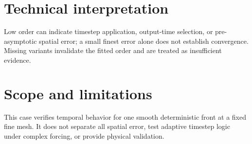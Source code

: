 \section{Technical interpretation}

Low order can indicate timestep application, output-time selection, or pre-asymptotic spatial error; a small finest error alone does not establish convergence. Missing variants invalidate the fitted order and are treated as insufficient evidence.

\section{Scope and limitations}

This case verifies temporal behavior for one smooth deterministic front at a fixed fine mesh. It does not separate all spatial error, test adaptive timestep logic under complex forcing, or provide physical validation.


